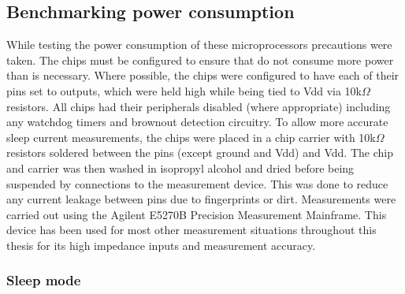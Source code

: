 


  \subsection{Benchmarking power consumption}

    While testing the power consumption of these microprocessors precautions were taken.
    The chips must be configured to ensure that do not consume more power than is necessary.
    Where possible, the chips were configured to have each of their pins set to outputs, which were held high while being tied to Vdd via 10k$\Omega$ resistors.
    All chips had their peripherals disabled (where appropriate) including any watchdog timers and brownout detection circuitry.
    To allow more accurate sleep current measurements, the chips were placed in a chip carrier with 10k$\Omega$ resistors soldered between the pins (except ground and Vdd) and Vdd.
    The chip and carrier was then washed in isopropyl alcohol and dried before being suspended by connections to the measurement device.
    This was done to reduce any current leakage between pins due to fingerprints or dirt.
    Measurements were carried out using the Agilent E5270B Precision Measurement Mainframe.
    This device has been used for most other measurement situations throughout this thesis for its high impedance inputs and measurement accuracy.


    \subsubsection{Sleep mode}



